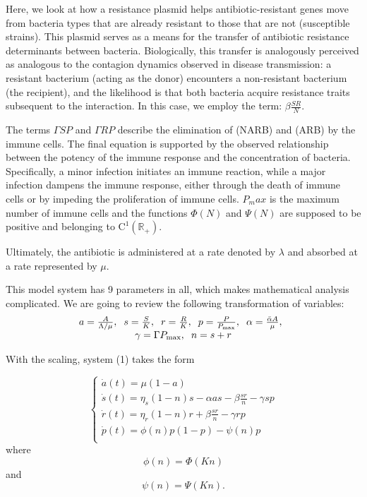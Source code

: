 Here, we look at how a resistance plasmid helps antibiotic-resistant genes move from bacteria types that are already resistant
to those that are not (susceptible strains). This plasmid serves as a means for the transfer of antibiotic resistance determinants
between bacteria. Biologically, this transfer is analogously perceived as analogous to the contagion dynamics observed in disease
transmission: a resistant bacterium (acting as the donor) encounters a non-resistant bacterium (the recipient), and the likelihood is
that both bacteria acquire resistance traits subsequent to the interaction. In this case, we employ the term: $\beta\frac{SR}{N}$.

The terms $\Gamma SP$ and $\Gamma RP$ describe the elimination of (NARB) and (ARB) by the immune cells. The final equation is
supported by the observed relationship between the potency of the immune response and the concentration of bacteria. Specifically,
a minor infection initiates an immune reaction, while a major infection dampens the immune response, either through the death of
immune cells or by impeding the proliferation of immune cells. $P_max$ is the maximum number of immune cells and the functions
$\Phi(N)$ and $\Psi(N)$ are supposed to be positive and belonging to $\mathrm{C}^1(\mathbb{R}_+)$.

Ultimately, the antibiotic is administered at a rate denoted by $\lambda$ and absorbed at a rate represented by $\mu$.

This model system has 9 parameters in all, which makes mathematical analysis complicated. We are going to review the
following transformation of variables:
\[ 
\begin{array}{ccccc}
	a = \frac{A}{\Lambda/\mu},\hspace{2mm} s = \frac{S}{K},\hspace{2mm} r = \frac{R}{K},\hspace{2mm} p = \frac{P}{P_{\max}},
	\hspace{2mm}
	\alpha = \frac{\bar{\alpha}A}{\mu},\hspace{2mm} \\ \gamma = \Gamma P_{\max},
	\hspace{2mm} n = s + r
\end{array}
\]

With the scaling, system (1) takes the form

\begin{equation}
	\begin{cases}
	\dot{a}(t)  =  \mu(1 - a)  \\
	\dot{s}(t)  =  \eta_s(1 - n)s - \alpha as - \beta \frac{sr}{n} - \gamma sp \\
	\dot{r}(t)  =  \eta_r(1 - n)r + \beta \frac{sr}{n} - \gamma rp \\
	\dot{p}(t)  =  \phi(n)p(1 - p) - \psi(n)p \\
	\end{cases}
\end{equation}
where
\[
\phi(n) = \Phi(Kn)
\]
and
\[
\psi(n) = \Psi(Kn).
\]

